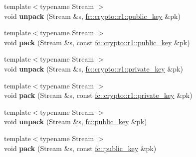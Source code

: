 \begin{DoxyCompactItemize}
\item 
\mbox{\label{namespacefc_1_1raw_ae8e7ac218185a9c15d64412d40259377}} 
{\footnotesize template$<$typename Stream $>$ }\\void {\bfseries unpack} (Stream \&s, \mbox{\hyperlink{classfc_1_1crypto_1_1r1_1_1public__key}{fc\+::crypto\+::r1\+::public\+\_\+key}} \&pk)
\item 
\mbox{\label{namespacefc_1_1raw_a7bdf702cd32dd7050ab6c0b29a28a0e2}} 
{\footnotesize template$<$typename Stream $>$ }\\void {\bfseries pack} (Stream \&s, const \mbox{\hyperlink{classfc_1_1crypto_1_1r1_1_1public__key}{fc\+::crypto\+::r1\+::public\+\_\+key}} \&pk)
\item 
\mbox{\label{namespacefc_1_1raw_ac783d54cc58a8caa8806f8f3374d867e}} 
{\footnotesize template$<$typename Stream $>$ }\\void {\bfseries unpack} (Stream \&s, \mbox{\hyperlink{classfc_1_1crypto_1_1r1_1_1private__key}{fc\+::crypto\+::r1\+::private\+\_\+key}} \&pk)
\item 
\mbox{\label{namespacefc_1_1raw_ae0bfc567156ab9bd1b17067194be8754}} 
{\footnotesize template$<$typename Stream $>$ }\\void {\bfseries pack} (Stream \&s, const \mbox{\hyperlink{classfc_1_1crypto_1_1r1_1_1private__key}{fc\+::crypto\+::r1\+::private\+\_\+key}} \&pk)
\item 
\mbox{\label{namespacefc_1_1raw_a0fe6fa531031326e9f6dbfdd08e06bd5}} 
{\footnotesize template$<$typename Stream $>$ }\\void {\bfseries unpack} (Stream \&s, \mbox{\hyperlink{classfc_1_1public__key}{fc\+::public\+\_\+key}} \&pk)
\item 
\mbox{\label{namespacefc_1_1raw_ae4d9360970406b2603f7595b0b2a658a}} 
{\footnotesize template$<$typename Stream $>$ }\\void {\bfseries pack} (Stream \&s, const \mbox{\hyperlink{classfc_1_1public__key}{fc\+::public\+\_\+key}} \&pk)
\item 
\mbox{\label{namespacefc_1_1raw_a32121452b49e67600af01cbd487c9436}} 

\end{DoxyCompactItemize}
